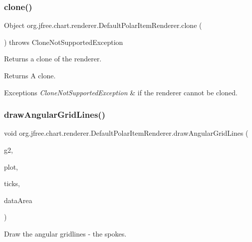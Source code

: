 \subsubsection{\texorpdfstring{clone()}{clone()}}
{\footnotesize\ttfamily Object org.\+jfree.\+chart.\+renderer.\+Default\+Polar\+Item\+Renderer.\+clone (\begin{DoxyParamCaption}{ }\end{DoxyParamCaption}) throws Clone\+Not\+Supported\+Exception}

Returns a clone of the renderer.

\begin{DoxyReturn}{Returns}
A clone.
\end{DoxyReturn}

\begin{DoxyExceptions}{Exceptions}
{\em Clone\+Not\+Supported\+Exception} & if the renderer cannot be cloned. \\
\hline
\end{DoxyExceptions}
\mbox{\label{classorg_1_1jfree_1_1chart_1_1renderer_1_1_default_polar_item_renderer_a5439ece62914fdbfbc77c1138cbbda92}} 
\subsubsection{\texorpdfstring{draw\+Angular\+Grid\+Lines()}{drawAngularGridLines()}}
{\footnotesize\ttfamily void org.\+jfree.\+chart.\+renderer.\+Default\+Polar\+Item\+Renderer.\+draw\+Angular\+Grid\+Lines (\begin{DoxyParamCaption}\item[{Graphics2D}]{g2,  }\item[{\mbox{\hyperlink{classorg_1_1jfree_1_1chart_1_1plot_1_1_polar_plot}{Polar\+Plot}}}]{plot,  }\item[{List}]{ticks,  }\item[{Rectangle2D}]{data\+Area }\end{DoxyParamCaption})}

Draw the angular gridlines -\/ the spokes.


